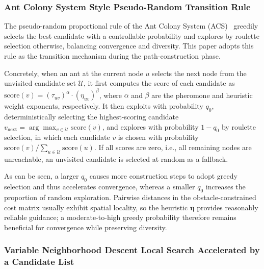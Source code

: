 \documentclass[lettersize,journal]{IEEEtran}
\begin{document}
\subsubsection{Ant Colony System Style Pseudo-Random Transition Rule}

The pseudo-random proportional rule of the Ant Colony System (ACS)~\textcolor{blue}{\cite{ref22}} greedily selects the best candidate with a controllable probability and explores by roulette selection otherwise, balancing convergence and diversity. This paper adopts this rule as the transition mechanism during the path-construction phase.

Concretely, when an ant at the current node $u$ selects the next node from the unvisited candidate set $\mathcal{U}$, it first computes the score of each candidate as $\mathrm{score}(v) = (\tau_{uv})^{\alpha} \cdot (\eta_{uv})^{\beta}$, where $\alpha$ and $\beta$ are the pheromone and heuristic weight exponents, respectively. It then exploits with probability $q_0$, deterministically selecting the highest-scoring candidate $v_{\mathrm{next}} = \arg\max_{v \in \mathcal{U}} \mathrm{score}(v)$, and explores with probability $1 - q_0$ by roulette selection, in which each candidate $v$ is chosen with probability $\mathrm{score}(v) / \sum_{u \in \mathcal{U}} \mathrm{score}(u)$. If all scores are zero, i.e., all remaining nodes are unreachable, an unvisited candidate is selected at random as a fallback.

As can be seen, a larger $q_0$ causes more construction steps to adopt greedy selection and thus accelerates convergence, whereas a smaller $q_0$ increases the proportion of random exploration. Pairwise distances in the obstacle-constrained cost matrix usually exhibit spatial locality, so the heuristic $\bm{\eta}$ provides reasonably reliable guidance; a moderate-to-high greedy probability therefore remains beneficial for convergence while preserving diversity.

\subsubsection{Variable Neighborhood Descent Local Search Accelerated by a Candidate List}
\label{subsec:vnd}
\end{document}
